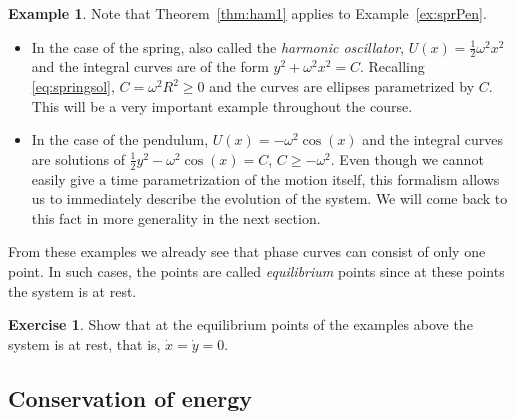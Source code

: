 \documentclass[english,fontsize=11pt,paper=b5]{scrbook}
\numberwithin{equation}{chapter}
\theoremstyle{definition}
\newtheorem{example}{Example}[chapter]
\newtheorem{exercise}{Exercise}[chapter]
\newcommand{\emphidx}[1]{\index{#1}\emph{#1}}
\begin{document}
    \begin{example}
      Note that Theorem~\ref{thm:ham1} applies to Example~\ref{ex:sprPen}.
      \begin{itemize}
        \item In the case of the spring, also called the \emph{harmonic oscillator}, $U(x) = \frac12 \omega^2 x^2$ and the integral curves are of the form $y^2 + \omega^2 x^2 = C$.
          Recalling \eqref{eq:springsol}, $C = \omega^2 R^2 \geq 0$ and the curves are ellipses parametrized by $C$.
          This will be a very important example throughout the course.
        \item In the case of the pendulum, $U(x) = -\omega^2 \cos(x)$ and the integral curves are solutions of $\frac12 y^2 - \omega^2 \cos(x) = C$, $C \geq -\omega^2$.
          Even though we cannot easily give a time parametrization of the motion itself, this formalism allows us to immediately describe the evolution of the system.
          We will come back to this fact in more generality in the next section.
      \end{itemize}
    \end{example}

    From these examples we already see that phase curves can consist of only one point. In such cases, the points are called \emphidx{equilibrium} points since at these points the system is at rest.

    \begin{exercise}
        Show that at the equilibrium points of the examples above the system is at rest, that is, $\dot x = \dot y = 0$.
    \end{exercise}

    \subsection{Conservation of energy}\label{sec:energy}
\end{document}
